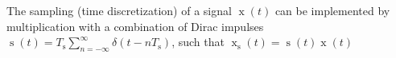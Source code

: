 The sampling (time discretization) of a signal $\operatorname{x}(t)$ can be implemented by multiplication with a combination of Dirac impulses
$\operatorname{s}(t) = T_{\mathrm{s}} \sum\limits_{n = -\infty}^{\infty} \delta(t - n T_{\mathrm{s}})$, such that $\operatorname{x}_{\mathrm{s}}(t) = \operatorname{s}(t) \operatorname{x}(t)$
